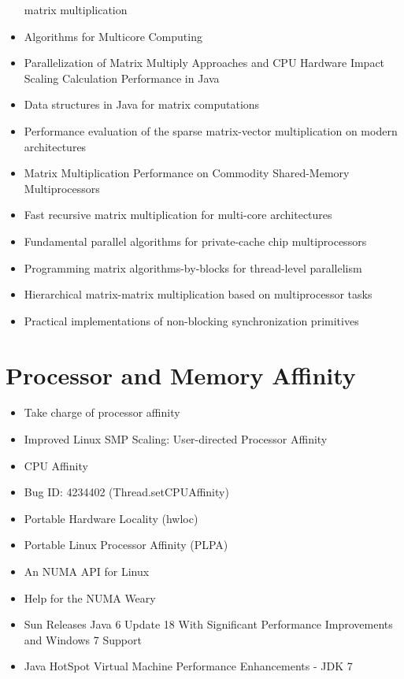 \begin{itemize}
  matrix multiplication \cite{Hunold2008}
\item[\textbullet] Algorithms for Multicore Computing
  \cite{Ramachandran2008}
\item[\textbullet] Parallelization of Matrix Multiply Approaches and
  CPU Hardware Impact Scaling Calculation Performance in Java
  \cite{Kim2010}
\item[\textbullet] Data structures in Java for matrix computations
  \cite{Gundersen2004}
\item[\textbullet] Performance evaluation of the sparse matrix-vector
  multiplication on modern architectures \cite{Goumas2009}
\item[\textbullet] Matrix Multiplication Performance on Commodity
  Shared-Memory Multiprocessors \cite{Tsilikas2004}
\item[\textbullet] Fast recursive matrix multiplication for multi-core
  architectures \cite{Runger2010}
\item[\textbullet] Fundamental parallel algorithms for private-cache
  chip multiprocessors \cite{Arge2008}
\item[\textbullet] Programming matrix algorithms-by-blocks for
  thread-level parallelism \cite{Quintana-Orti2009}
\item[\textbullet] Hierarchical matrix-matrix multiplication based on
  multiprocessor tasks \cite{Hunold2004}
\item[\checkmark] Practical implementations of non-blocking
  synchronization primitives \cite{Moir1997}
\end{itemize}


\section*{Processor and Memory Affinity}
\label{sec:lr-processor-and-memory-affinity}

\begin{itemize}
\item[\checkmark] Take charge of processor affinity \cite{Dow2005}
\item[\checkmark] Improved Linux SMP Scaling: User-directed Processor Affinity
  \cite{Foong2008}
\item[\checkmark] CPU Affinity \cite{Love2003}
\item[\checkmark] Bug ID: 4234402 (Thread.setCPUAffinity)
  \cite{Oracle1999}
\item[\checkmark] Portable Hardware Locality (hwloc)
  \cite{OpenMPI2010}
\item[\checkmark] Portable Linux Processor Affinity (PLPA)
  \cite{OpenMPI2010a}
\item[\checkmark] An NUMA API for Linux \cite{Kleen2004}
\item[\checkmark] Help for the NUMA Weary \cite{Masamitsu2008}
\item[\checkmark] Sun Releases Java 6 Update 18 With Significant
  Performance Improvements and Windows 7 Support \cite{Humble2010}
\item[\checkmark] Java HotSpot Virtual Machine Performance
  Enhancements - JDK 7 \cite{Oracle2010}
\end{itemize}


